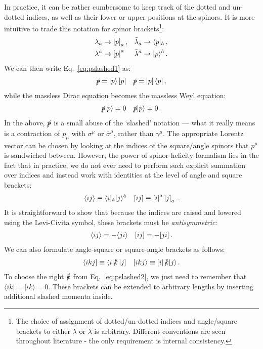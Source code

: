 \documentclass[main.tex]{subfiles}
\begin{document}
In practice, it can be rather cumbersome to keep track of the dotted and un-dotted indices, as well as their lower or upper positions at the spinors. It is more intuitive to trade this notation for spinor brackets\footnote{The choice of assignment of dotted/un-dotted indices and angle/square brackets to either $\lambda$ or $\tilde{\lambda}$ is arbitrary. Different conventions are seen throughout literature - the only requirement is internal consistency.}:
\begin{align} \label{eq:lambdatobraket}
    \lambda_a  &\rightarrow \left| p \right]_a,  &&\tilde{\lambda}_{\dot{a}} \rightarrow \langle p|_{\dot{a}}\,, \nonumber \\
    \lambda^a  &\rightarrow \left[ p \right|^a  &&\tilde{\lambda}^{\dot{a}} \rightarrow |p \rangle^{\dot{a}} \,.
\end{align}
We can then write Eq.~\ref{eq:pslashed1} as:
\begin{align} \label{eq:pslashed2}
    \slashed{p} = |p \rangle\left[ p \right| && \slashed{p} = \left| p \right] \langle p| \,,
\end{align}
while the massless Dirac equation becomes the massless Weyl equation:
\begin{align} \label{eq:weyleq}
    \slashed{p}|p \rangle = 0 && \slashed{p}|p \rangle = 0\,.
\end{align}
In the above, $\slashed{p}$ is a small abuse of the `slashed' notation --- what it really means is a contraction of $p_\mu$ with $\sigma^\mu$ or $\bar{\sigma}^\mu$, rather than $\gamma^\mu$. The appropriate Lorentz vector can be chosen by looking at the indices of the square/angle spinors that $p^\mu$ is sandwiched between. However, the power of spinor-helicity formalism lies in the fact that in practice, we do not ever need to perform such explicit summation over indices and instead work with identities at the level of angle and square brackets:
\begin{align}
    \langle ij \rangle \equiv \langle i|_{\dot{a}} |j \rangle^{\dot{a}}&& [ ij ] \equiv \left[ i \right|^a \left| j \right]_a \,.     
\end{align}
It is straightforward to show that because the indices are raised and lowered using the Levi-Civita symbol, these brackets must be \textit{antisymmetric}:
\begin{align}
    \langle ij \rangle = -\langle ji \rangle && [ ij ] = -[ ji ]\,.
\end{align}
We can also formulate angle-square or square-angle brackets as follows:
\begin{align}
    \langle ikj ] \equiv \langle i| \slashed{k} \left| j \right] && [ikj\rangle \equiv \left[ i \right| \slashed{k} |j \rangle\,.
\end{align}
To choose the right $\slashed{k}$ from Eq.~\ref{eq:pslashed2}, we just need to remember that $\langle ik] = [ik\rangle = 0$. These brackets can be extended to arbitrary lengths by inserting additional slashed momenta inside. 
\end{document}
